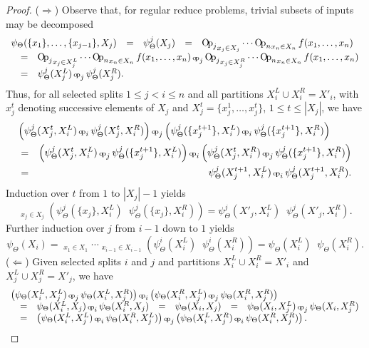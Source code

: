 \documentclass{article}
\newcommand{\OpSym}{\mathrm{O\!p}}
\newcommand{\opsym}{{\scriptstyle \mathrm{o\!p}}}
\newcommand{\OpCurry}[3][]{\mathop{\OpSym^{#1}_{#2}{#3}}}
\newcommand{\opcurry}[3][]{\mathop{\opsym^{#1}_{#2}{#3}}}
\newcommand{\Op}[2][]{\OpCurry[#1]{#2}{}}
\newcommand{\op}[2][]{\opcurry[#1]{#2}{}}
\newcommand{\GNP}{\psi_{\Theta}}
\begin{document}
\begin{proof}
  ($\Rightarrow$) Observe that, for regular reduce problems, trivial
  subsets of inputs may be decomposed
  \[ \begin{array}{rclclcl}
    \multicolumn{3}{l}{\GNP(\{x_1\},\ldots,\{x_{j-1}\},X_j)} & = & \GNP^j(X_j) & = & \Op{j}_{x_j \in X_j}\cdots\Op{n}_{x_n \in X_n}f(x_1,\ldots,x_n) \\
    & = & \multicolumn{5}{l}{\Op{j}_{x_j \in X^L_j}\cdots\Op{n}_{x_n \in X_n}f(x_1,\ldots,x_n) \op{j} \Op{j}_{x_j \in X^R_j}\cdots\Op{n}_{x_n \in X_n}f(x_1,\ldots,x_n)} \\
    & = & \multicolumn{5}{l}{\GNP^j(X^L_j) \op{j} \GNP^j(X^R_j).}
  \end{array} \]
  Thus, for all selected splits $1 \leq j < i \leq n$ and all
  partitions $X^L_i \cup X^R_i = X'_i$, with $x^t_j$ denoting
  successive elements of $X_j$ and $X^t_j = \{x^1_j,\ldots,x^t_j\}$,
  $1 \leq t \leq |X_j|$, we have
  \begin{eqnarray*}
    \lefteqn{\left( \GNP^j(X^t_j,X^L_i) \op{i} \GNP^j(X^t_j,X^R_i) \right) \op{j} \left( \GNP^j(\{x^{t+1}_j\},X^L_i) \op{i} \GNP^j(\{x^{t+1}_j\},X^R_i) \right)} \\
    & = & \left( \GNP^j(X^t_j,X^L_i) \op{j} \GNP^j(\{x^{t+1}_j\},X^L_i) \right) \op{i} \left( \GNP^j(X^t_j,X^R_i) \op{j} \GNP^j(\{x^{t+1}_j\},X^R_i) \right) \\
    & = & \GNP^j(X^{t+1}_j,X^L_i) \op{i} \GNP^j(X^{t+1}_j,X^R_i).
  \end{eqnarray*}
  Induction over $t$ from $1$ to $|X_j| - 1$ yields
  \[
  \Op{j}_{x_j \in X_j} \left( \GNP^j(\{x_j\},X^L_i) \op{i} \GNP^j(\{x_j\},X^R_i) \right) = \GNP^j(X'_j,X^L_i) \op{i} \GNP^j(X'_j,X^R_i).
  \]
  Further induction over $j$ from $i-1$ down to $1$ yields
  \[
  \GNP(X_i) = \Op{1}_{x_1 \in X_1}\cdots\Op{i-1}_{x_{i-1} \in X_{i-1}} \left( \GNP^i(X^L_i) \op{i} \GNP^i(X^R_i) \right) = \GNP(X^L_i) \op{i} \GNP(X^R_i).
  \]
  ($\Leftarrow$) Given selected splits $i$ and $j$ and partitions
  $X^L_i \cup X^R_i = X'_i$ and $X^L_j \cup X^R_j = X'_j$, we have
  \[ \begin{array}{rclclcl}
    \lefteqn{\left( \GNP(X^L_i,X^L_j) \op{j} \GNP(X^L_i,X^R_j) \right) \op{i} \left( \GNP(X^R_i,X^L_j) \op{j} \GNP(X^R_i,X^R_j) \right)} \\
    & = & \GNP(X^L_i,X_j) \op{i} \GNP(X^R_i,X_j) & = & \GNP(X_i,X_j) & = & \GNP(X_i,X^L_j) \op{j} \GNP(X_i,X^R_j) \\
    & = & \multicolumn{5}{l}{\left( \GNP(X^L_i,X^L_j) \op{i} \GNP(X^R_i,X^L_j) \right) \op{j} \left( \GNP(X^L_i,X^R_j) \op{i} \GNP(X^R_i,X^R_j) \right) .}
  \end{array} \]
\end{proof}
\end{document}
